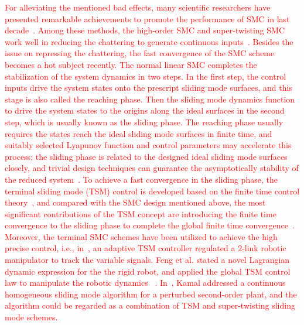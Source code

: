 \documentclass[3p]{elsarticle}
\theoremstyle{plain}
\theoremstyle{remark}
\begin{document}
\textcolor{red}{For alleviating the mentioned bad effects, many scientific researchers have presented remarkable achievements to promote the performance of SMC in last decade~\cite{zong2013quasi,santiesteban2013time,mu2015continuous,evangelista2013lyapunov,gonzalez2014chattering,dadras2012fractional,zhao2013output}. Among these methods, the high-order SMC and super-twisting SMC work well in reducing the chattering to generate continuous inputs~\cite{castillo2015higher,palosz2015laser,edwards2016adaptive,zhao2015finite,liu2015second}. Besides the issue on repressing the chattering, the fast convergence of the SMC scheme becomes a hot subject recently. The normal linear SMC completes the stabilization of the system dynamics in two steps. In the first step, the control inputs drive the system states onto the prescript sliding mode  surfaces, and this stage is also called the reaching phase. Then the sliding mode dynamics function to drive the system states to the origins along the ideal surfaces in the second step, which is usually known as the sliding phase. The reaching phase usually requires the states reach the ideal sliding mode surfaces in finite time, and suitably selected Lyapunov function and control parameters may accelerate this process; the sliding phase is related to the designed ideal sliding mode  surfaces closely, and trivial design techniques can guarantee the asymptotically stability of the reduced system~\cite{mu2016switching}. To achieve a fast convergence in the sliding phase, the terminal sliding mode (TSM) control is developed based on the finite time control theory~\cite{haimo1986finite,bhat1997finite}, and compared with the SMC design mentioned above, the most significant contributions of the TSM concept are introducing the finite time convergence to the sliding phase to complete the global finite time convergence~\cite{mu2016switching}. Moreover, the terminal SMC schemes have been utilized to achieve the high precise control, i.e., in~\cite{li2015robust}, an adaptive TSM controller regulated a $2$-link robotic manipulator to track the variable signals. Feng et al. stated a novel Lagrangian dynamic expression for the the rigid robot, and applied the global TSM control law to manipulate the robotic dynamics ~\cite{feng2002non}. In~\cite{kamal2016continuous}, Kamal addressed a continuous homogeneous sliding mode algorithm for a perturbed second-order plant, and the algorithm could be regarded as a combination of TSM and super-twisting sliding mode schemes.}
\end{document}
